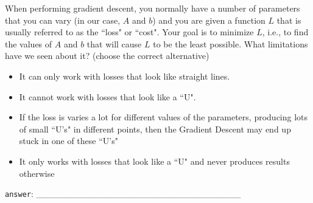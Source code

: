 \documentclass[a4paper,11pt]{scrartcl}
\begin{document}
When performing gradient descent, you normally have a number of parameters that
you can vary (in our case, $A$ and $b$) and you are given a function $L$ that
is usually referred to as the ``loss" or ``cost". Your goal is to minimize $L$,
i.e., to find the values of $A$ and $b$ that will cause $L$ to be the least
possible. What limitations have we seen about it?
(choose the correct alternative)

\begin{itemize}
\singlespacing
\item It can only work with losses that look like straight lines.
\item It cannot work with losses that look like a ``U".
\item If the loss is varies a lot for different values of the parameters,
      producing lots of small ``U's" in different points, then the Gradient
      Descent may end up stuck in one of these ``U's"
\item It only works with losses that look like a ``U" and never produces results
      otherwise
\end{itemize}

\verb|answer|: \_\_\_\_\_\_\_\_\_\_\_\_\_\_\_\_\_\_\_\_\_\_\_\_\_\_\_\_\_\_\_\_
\end{document}
